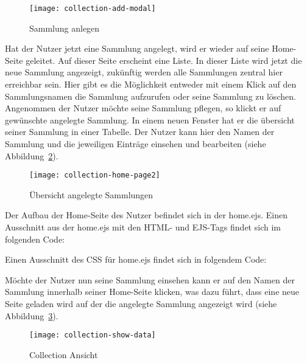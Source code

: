 \begin{figure}[h]
    \centering
    \texttt{[image: collection-add-modal]}
    \caption{Sammlung anlegen}
    \label{fig:collection-add-modal}
\end{figure}

Hat der Nutzer jetzt eine Sammlung angelegt, wird er wieder auf seine Home-Seite geleitet.
Auf dieser Seite erscheint eine Liste.
In dieser Liste wird jetzt die neue Sammlung angezeigt, zukünftig werden alle Sammlungen zentral hier erreichbar sein.
Hier gibt es die Möglichkeit entweder mit einem Klick auf den Sammlungsnamen die Sammlung aufzurufen oder seine Sammlung zu löschen.
Angenommen der Nutzer möchte seine Sammlung pflegen, so klickt er auf gewünschte angelegte Sammlung.
In einem neuen Fenster hat er die übersicht seiner Sammlung in einer Tabelle.
Der Nutzer kann hier den Namen der Sammlung und die jeweiligen Einträge einsehen und bearbeiten (siehe Abbildung~\ref{fig:collection-home-page2}).
\newpage
\begin{figure}[h]
    \centering
    \texttt{[image: collection-home-page2]}
    \caption{Übersicht angelegte Sammlungen}
    \label{fig:collection-home-page2}
\end{figure}


Der Aufbau der Home-Seite des Nutzer befindet sich in der home.ejs.
Einen Ausschnitt aus der home.ejs mit den HTML- und EJS-Tags findet sich im folgenden Code:

\vspace{1em}

\vspace{1em}

Einen Ausschnitt des CSS für home.ejs findet sich in folgendem Code:

\vspace{1em}

\vspace{1em}

Möchte der Nutzer nun seine Sammlung einsehen kann er auf den Namen der Sammlung innerhalb seiner Home-Seite klicken, was dazu führt, dass eine neue Seite geladen wird auf der die angelegte Sammlung angezeigt wird (siehe Abbildung~\ref{fig:collection-show-data}).

\begin{figure}[h]
    \centering
    \texttt{[image: collection-show-data]}
    \caption{Collection Ansicht}
    \label{fig:collection-show-data}
\end{figure}

